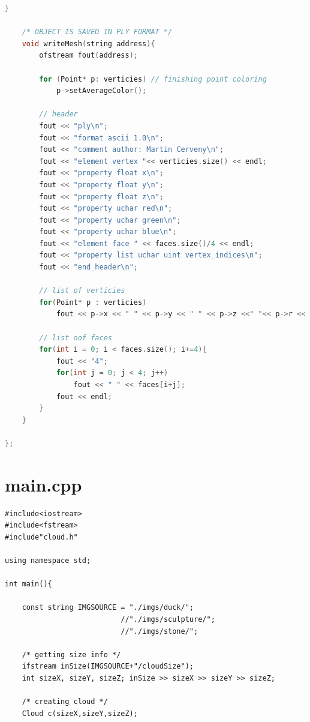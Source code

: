 \documentclass[12pt]{report}			%
\begin{document}
\begin{appendices}
\begin{lstlisting}[language = C++]
    }

    /* OBJECT IS SAVED IN PLY FORMAT */
    void writeMesh(string address){
        ofstream fout(address);

        for (Point* p: verticies) // finishing point coloring
            p->setAverageColor();

        // header
        fout << "ply\n";
        fout << "format ascii 1.0\n";
        fout << "comment author: Martin Cerveny\n";
        fout << "element vertex "<< verticies.size() << endl;
        fout << "property float x\n";
        fout << "property float y\n";
        fout << "property float z\n";
        fout << "property uchar red\n";
        fout << "property uchar green\n";
        fout << "property uchar blue\n";
        fout << "element face " << faces.size()/4 << endl;
        fout << "property list uchar uint vertex_indices\n";
        fout << "end_header\n"; 

        // list of verticies
        for(Point* p : verticies)
            fout << p->x << " " << p->y << " " << p->z <<" "<< p->r << " " << p->g <<" "<< p->b << endl;
        
        // list oof faces
        for(int i = 0; i < faces.size(); i+=4){   
            fout << "4";
            for(int j = 0; j < 4; j++)
                fout << " " << faces[i+j];
            fout << endl;
        }
    }
   
};

        \end{lstlisting}

    \chapter{main.cpp}
        \begin{lstlisting}
#include<iostream>
#include<fstream>
#include"cloud.h"

using namespace std;

int main(){

    const string IMGSOURCE = "./imgs/duck/";
                           //"./imgs/sculpture/";
                           //"./imgs/stone/";

    /* getting size info */
    ifstream inSize(IMGSOURCE+"/cloudSize");
    int sizeX, sizeY, sizeZ; inSize >> sizeX >> sizeY >> sizeZ;

    /* creating cloud */
    Cloud c(sizeX,sizeY,sizeZ);


\end{lstlisting}
\end{appendices}
\end{document}
